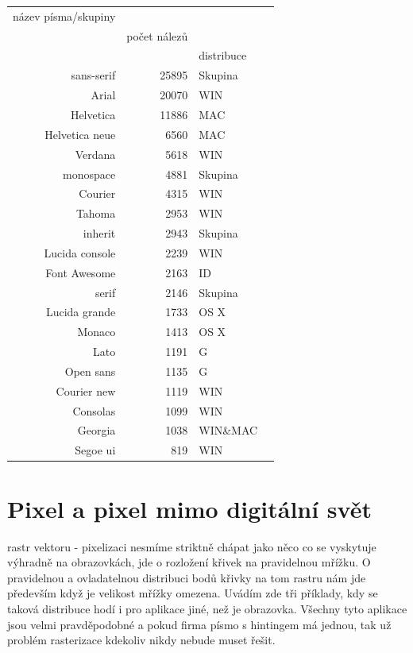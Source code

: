 \documentclass[a4paper]{article}
\begin{document}
\begin{tabular}{r|rlr}
název písma/skupiny & \\
& počet nálezů & \\
&& distribuce&\\
\midrule
sans-serif & 25895 &  Skupina\\
Arial & 20070 & WIN\\
Helvetica & 11886 & MAC\\
Helvetica neue & 6560 & MAC\\
Verdana & 5618 & WIN\\
monospace & 4881 & Skupina\\
Courier & 4315 & WIN\\
Tahoma & 2953 & WIN\\
inherit & 2943 & Skupina\\
Lucida console & 2239 & WIN\\
Font Awesome & 2163 & ID\\
serif & 2146 & Skupina\\
Lucida grande & 1733 & OS X\\
Monaco & 1413 & OS X\\
Lato & 1191 & G\\
Open sans & 1135 & G\\
Courier new & 1119 & WIN\\
Consolas & 1099 & WIN\\
Georgia &  1038 & WIN\&MAC\\
Segoe ui & 819 & WIN\\
\end{tabular}

\section{Pixel a pixel mimo digitální svět}
rastr vektoru - pixelizaci nesmíme striktně chápat jako něco co se vyskytuje výhradně na obrazovkách, jde o rozložení křivek na pravidelnou mřížku. O pravidelnou a ovladatelnou distribuci bodů křivky na tom rastru nám jde především když je velikost mřížky omezena. Uvádím zde tři příklady, kdy se taková distribuce hodí i pro aplikace jiné, než je obrazovka. Všechny tyto aplikace jsou velmi pravděpodobné a pokud firma písmo s hintingem má jednou, tak už problém rasterizace kdekoliv nikdy nebude muset řešit.\\
\end{document}
